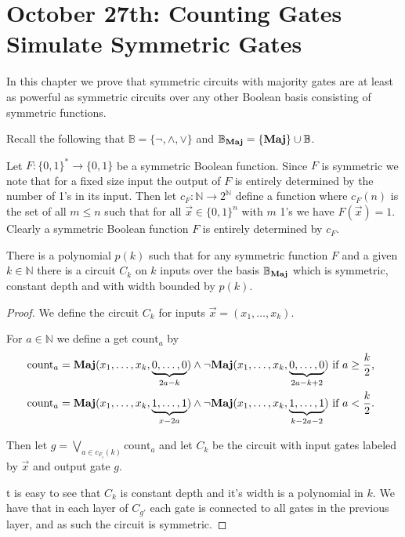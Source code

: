 \documentclass[12pt]{report}
\newcommand{\maj}{\text{\textbf{Maj}}}
\newcommand{\countgate}{\text{count}}
\begin{document}
\chapter{October 27th: Counting Gates Simulate Symmetric Gates}

In this chapter we prove that symmetric circuits with majority gates are at
least as powerful as symmetric circuits over any other Boolean basis consisting
of symmetric functions.

Recall the following that $\mathbb{B} = \{ \neg , \wedge , \lor \}$ and
$\mathbb{B}_\maj = \{ \maj \} \cup \mathbb{B}$.

Let $F: \{0,1\}^* \rightarrow \{0,1\}$ be a symmetric Boolean function. Since
$F$ is symmetric we note that for a fixed size input the output of $F$ is
entirely determined by the number of 1's in its input. Then let
$c_{F}:\mathbb{N} \rightarrow 2^{\mathbb{N}}$ define a function where $c_{F}(n)$
is the set of all $m \leq n$ such that for all $\vec{x} \in \{ 0,1 \}^n$ with
$m$ 1's we have $F (\vec{x}) = 1$. Clearly a symmetric Boolean function $F$ is
entirely determined by $c_{F}$.
 
\begin{prop}
  \label{prop:fuctions-maj}
  There is a polynomial $p(k)$ such that for any symmetric function $F$ and a
  given $k \in \mathbb{N}$ there is a circuit $C_k$ on $k$ inputs over the basis
  $\mathbb{B}_\maj$ which is symmetric, constant depth and with width bounded by
  $p(k)$.
\end{prop}

\begin{proof}
  We define the circuit $C_k$ for inputs $\vec{x} = ( x_1, \ldots, x_k )$.

  For $a \in \mathbb{N}$ we define a get $\countgate_a$ by
  \begin{align*}
    &\countgate_a = \maj (x_1, \ldots, x_k, \underbrace {0, \ldots, 0}_{2a -
      k}) \land \neg \maj (x_1, \ldots , x_k, \underbrace{0, \ldots,  0}_{2a - k + 2})\text{ if $a \geq \frac{k}{2}$,} \\
    &\countgate_a = \maj (x_1, \ldots, x_k, \underbrace {1, \ldots, 1}_{x -
      2a}) \land \neg \maj (x_1, \ldots , x_k, \underbrace{1, \ldots,
      1}_{k - 2a -2}) \text{ if $a < \frac{k}{2}$. }
  \end{align*}

  Then let $g = \bigvee_{a \in c_{F_i}(k)}\countgate_a$ and let $C_{k}$ be the
  circuit with input gates labeled by $\vec{x}$ and output gate $g$.

  t is easy to see that $C_k$ is constant depth and it's width is a polynomial
  in $k$. We have that in each layer of $C_{g'}$ each gate is connected to all
  gates in the previous layer, and as such the circuit is symmetric.
\end{proof}
\end{document}
